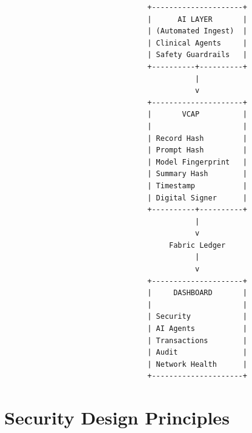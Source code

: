 \documentclass[11pt,a4paper]{article}
\begin{document}
\begin{lstlisting}
                                 +---------------------+
                                 |      AI LAYER       |
                                 | (Automated Ingest)  |
                                 | Clinical Agents     |
                                 | Safety Guardrails   |
                                 +----------+----------+
                                            |
                                            v
                                 +---------------------+
                                 |       VCAP          |
                                 |                     |
                                 | Record Hash         |
                                 | Prompt Hash         |
                                 | Model Fingerprint   |
                                 | Summary Hash        |
                                 | Timestamp           |
                                 | Digital Signer      |
                                 +----------+----------+
                                            |
                                            v
                                      Fabric Ledger
                                            |
                                            v
                                 +---------------------+
                                 |     DASHBOARD       |
                                 |                     |
                                 | Security            |
                                 | AI Agents           |
                                 | Transactions        |
                                 | Audit               |
                                 | Network Health      |
                                 +---------------------+
\end{lstlisting}

\newpage
\section{Security Design Principles}
\end{document}
